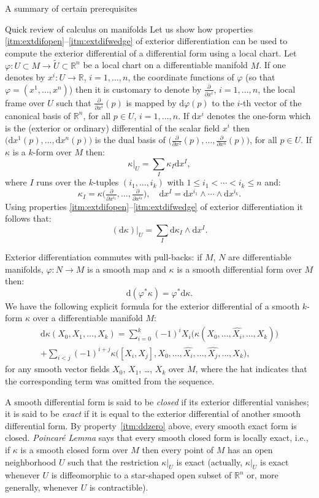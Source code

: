 \documentclass[oneside,a4paper,11pt]{amsbook}
\newcommand{\R}{\mathds R}
\newcommand{\dd}{\mathrm d}
\theoremstyle{remark}\newtheorem{exercise}{Exercise}[chapter]
\theoremstyle{plain}\newtheorem{teo}{Theorem}[section]
\theoremstyle{plain}\newtheorem{lem}[teo]{Lemma}
\theoremstyle{plain}\newtheorem{prop}[teo]{Proposition}
\theoremstyle{plain}\newtheorem{cor}[teo]{Corollary}
\theoremstyle{definition}\newtheorem{defin}[teo]{Definition}
\theoremstyle{remark}\newtheorem{rem}[teo]{Remark}
\theoremstyle{definition}\newtheorem{notation}[teo]{Notation}
\theoremstyle{definition}\newtheorem{convention}[teo]{Convention}
\theoremstyle{definition}\newtheorem{example}[teo]{Example}
\numberwithin{section}{chapter}
\numberwithin{equation}{section}
\begin{document}
\begin{chapter}{A summary of certain prerequisites}
\begin{section}{Quick review of calculus on manifolds}
Let us show how properties \eqref{itm:extdifopen}--\eqref{itm:extdifwedge} of exterior differentiation can be used to compute
the exterior differential of a differential form using a local chart.
Let $\varphi:U\subset M\to\widetilde U\subset\R^n$ be a local chart on a differentiable manifold $M$. If one denotes
by $x^i:U\to\R$, $i=1,\ldots,n$, the coordinate functions of $\varphi$ (so that $\varphi=(x^1,\ldots,x^n)$) then it
is customary to denote by $\frac{\partial}{\partial x^i}$, $i=1,\ldots,n$, the local frame over $U$ such that
$\frac{\partial}{\partial x^i}(p)$ is mapped by $\dd\varphi(p)$ to the $i$-th vector of the canonical basis of $\R^n$,
for all $p\in U$, $i=1,\ldots,n$. If $\dd x^i$ denotes the one-form which is the (exterior or ordinary) differential of
the scalar field $x^i$ then $\big(\dd x^1(p),\ldots,\dd x^n(p)\big)$ is the dual basis of
$\big(\frac{\partial}{\partial x^1}(p),\ldots,\frac{\partial}{\partial x^n}(p)\big)$, for all $p\in U$. If $\kappa$
is a $k$-form over $M$ then:
\[\kappa\vert_U=\sum_I\kappa_I\dd x^I,\]
where $I$ runs over the $k$-tuples $(i_1,\ldots,i_k)$ with $1\le i_1<\cdots<i_k\le n$ and:
\[\kappa_I=\kappa\big(\tfrac{\partial}{\partial x^{i_1}},\ldots,\tfrac{\partial}{\partial x^{i_k}}\big),
\quad\dd x^I=\dd x^{i_1}\wedge\cdots\wedge\dd x^{i_k}.\]
Using properties \eqref{itm:extdifopen}--\eqref{itm:extdifwedge} of exterior differentiation it follows that:
\[(\dd\kappa)\vert_U=\sum_I\dd\kappa_I\wedge\dd x^I.\]


Exterior differentiation commutes with pull-backs: if $M$, $N$ are differentiable manifolds,
$\varphi:N\to M$ is a smooth map and $\kappa$ is a smooth differential form over $M$ then:
\[\dd(\varphi^*\kappa)=\varphi^*\dd\kappa.\]
We have the following explicit formula for the exterior differential of a smooth $k$-form $\kappa$ over a differentiable manifold $M$:
\begin{multline}\label{eq:Cartanextdiff}
\dd\kappa(X_0,X_1,\ldots,X_k)=\sum_{i=0}^k(-1)^iX_i\big(\kappa(X_0,\ldots,\widehat{X_i},\ldots,X_k)\big)\\
+\sum_{i<j}(-1)^{i+j}\kappa\big([X_i,X_j],X_0,\ldots,\widehat{X_i},\ldots,\widehat{X_j},\ldots,X_k),
\end{multline}
for any smooth vector fields $X_0$, $X_1$, \dots, $X_k$ over $M$, where the hat indicates that the corresponding term was omitted from the sequence.

A smooth differential form is said to be {\em closed\/} if its exterior differential vanishes; it is said to be
{\em exact\/} if it is equal to the exterior differential of another smooth differential form. By property~\ref{itm:ddzero}
above, every smooth exact form is closed. {\em Poincar\'e Lemma\/} says that every smooth closed form is locally exact,
i.e., if $\kappa$ is a smooth closed form over $M$ then every point of $M$ has an open neighborhood $U$ such that the
restriction $\kappa\vert_U$ is exact (actually, $\kappa\vert_U$ is exact whenever $U$ is diffeomorphic to a star-shaped
open subset of $\R^n$ or, more generally, whenever $U$ is contractible).


\end{section}
\end{chapter}
\end{document}
